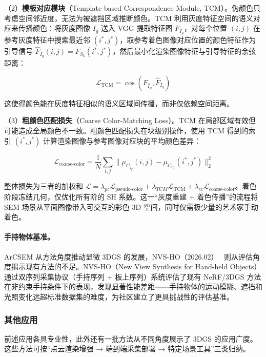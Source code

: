 （2）\textbf{模板对应模块}（Template-based Correspondence Module, TCM）。伪颜色只考虑空间邻近度，无法为被遮挡区域推断颜色。TCM 利用灰度特征空间的语义对应来传播颜色：将灰度图像 $I_g$ 送入 VGG 提取特征图 $F_{I_g}$，对每个位置 $(i,j)$ 在参考灰度特征中搜索最近邻 $(i^*, j^*)$，取参考着色图像对应位置的颜色特征作为引导信号 $\hat{F}_{I_g}(i,j) = F_{S_k}(i^*, j^*)$，然后最小化渲染图像特征与引导特征的余弦距离：

\begin{equation}
\mathcal{L}_{\text{TCM}} = \cos(F_{\hat{I}_g}, \hat{F}_{I_g})
\end{equation}

这使得颜色能在灰度特征相似的语义区域间传播，而非仅依赖空间距离。

（3）\textbf{粗颜色匹配损失}（Coarse Color-Matching Loss）。TCM 在局部区域有效但可能造成全局颜色不一致。粗颜色匹配损失在块级别操作，使用 TCM 得到的索引 $(i^*,j^*)$ 计算渲染图像与参考图像对应块的平均颜色差异：

\begin{equation}
\mathcal{L}_{\text{coarse-color}} = \frac{1}{N}\sum_{i,j} \|\mu_{C_{\hat{I}_g}}(i,j) - \mu_{C_{S_k}}(i^*,j^*)\|_2^2
\end{equation}

整体损失为三者的加权和 $\mathcal{L} = \lambda_{pc}\mathcal{L}_{\text{pseudo-color}} + \lambda_{TCM}\mathcal{L}_{\text{TCM}} + \lambda_{cc}\mathcal{L}_{\text{coarse-color}}$。着色阶段冻结几何，仅优化所有阶的 SH 系数。这一“灰度重建 + 着色传播”的流程将 SEM 场景从平面图像带入可交互的彩色 3D 空间，同时仅需极少量的艺术家手动着色。

\paragraph{手持物体基准。}

ArCSEM 从方法角度推动显微 3DGS 的发展，NVS-HO（2026.02）~\cite{2602_05822} 则从评估角度揭示现有方法的不足。NVS-HO（New View Synthesis for Hand-held Objects）通过双序列采集协议（手持序列 + 板上序列）系统评估了现有 NeRF/3DGS 方法在非约束手持条件下的表现，发现显著性能差距——手持物体的运动模糊、遮挡和光照变化远超标准数据集的难度，为社区建立了更具挑战性的评估基准。

\subsubsection{其他应用}

前述应用各具专业性，此外还有一批方法从不同角度展示了 3DGS 的应用广度。这些方法可按“点云渲染增强 → 端到端采集部署 → 特定场景工具”三类归纳。

